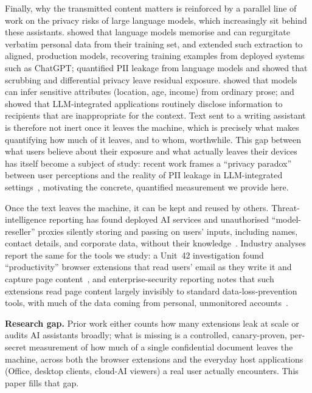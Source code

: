 \documentclass[10pt,conference,a4paper]{IEEEtran}
\begin{document}
Finally, why the transmitted content matters is reinforced by a parallel line
of work on the privacy risks of large language models, which increasingly sit behind
these assistants. \citet{carlini2021extracting} showed that language models memorise and
can regurgitate verbatim personal data from their training set, and
\citet{nasr2025scalable} extended such extraction to aligned, production models,
recovering training examples from deployed systems such as ChatGPT;
\citet{lukas2023pii} quantified PII leakage from language models and showed that scrubbing
and differential privacy leave residual exposure. \citet{staab2024beyond} showed that
models can infer sensitive attributes (location, age, income) from ordinary prose;
and \citet{mireshghallah2024cansecret} showed that LLM-integrated applications routinely
disclose information to recipients that are inappropriate for the context. Text sent to a writing
assistant is therefore not inert once it leaves the machine, which is precisely what
makes quantifying how much of it leaves, and to whom, worthwhile. This gap between what
users believe about their exposure and what actually leaves their devices has itself
become a subject of study: recent work frames a ``privacy paradox'' between user
perceptions and the reality of PII leakage in LLM-integrated
settings~\citep{privacyparadox2026}, motivating the concrete, quantified measurement we
provide here.

Once the text leaves the machine, it can be kept and reused by others. Threat-intelligence
reporting has found deployed AI services and unauthorised ``model-reseller'' proxies
silently storing and passing on users' inputs, including names, contact details, and
corporate data, without their knowledge~\citep{anthropic2026threats}. Industry analyses
report the same for the tools we study: a Unit~42 investigation found ``productivity''
browser extensions that read users' email as they write it and capture page
content~\citep{unit42genai2026}, and enterprise-security reporting notes that such
extensions read page content largely invisibly to standard data-loss-prevention tools,
with much of the data coming from personal, unmonitored accounts~\citep{csa2026extensions,
cyberhaven2026}.

\textbf{Research gap.} Prior work either counts how many extensions leak at
scale or audits AI assistants broadly; what is missing is a controlled, canary-proven,
per-secret measurement of how much of a single confidential document leaves the
machine, across both the browser extensions and the everyday host applications (Office,
desktop clients, cloud-AI viewers) a real user actually encounters. This paper fills that
gap.
\end{document}
